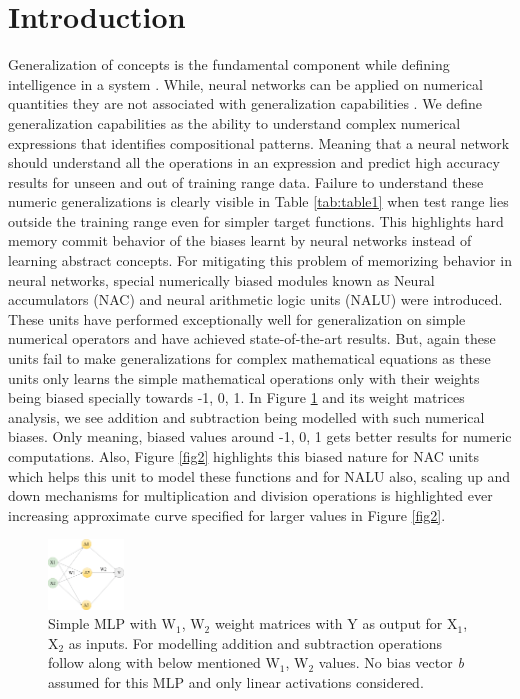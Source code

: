 \documentclass[conference]{IEEEtran}
\begin{document}
\section{Introduction}

Generalization of concepts is the fundamental component while defining intelligence in a system  \cite{b1} \cite{b2}. While, neural networks can be applied on numerical quantities they are not associated with generalization capabilities \cite{b3, b4}. We define generalization capabilities as the ability to understand complex numerical expressions that identifies compositional patterns. 
Meaning that a neural network should understand all the operations in an expression and predict high accuracy results for unseen and out of training range data.
Failure to understand these numeric generalizations is clearly visible in Table \ref{tab:table1} when test range lies outside the training range even for simpler target functions. This highlights hard memory commit behavior of the biases learnt by neural networks instead of learning abstract concepts. For mitigating this problem of memorizing behavior in neural networks, special numerically biased modules known as Neural accumulators (NAC) and neural arithmetic logic units (NALU) \cite{b5} were introduced. These units have performed exceptionally well for generalization on simple numerical operators and have achieved state-of-the-art results. But, again these units fail to make generalizations for complex mathematical equations as these units only learns the simple mathematical operations only with their weights being biased specially towards -1, 0, 1. In Figure \ref{fig1} and its weight matrices analysis, we see addition and subtraction being modelled with such numerical biases. Only meaning, biased values around -1, 0, 1 gets better results for numeric computations. Also, Figure \ref{fig2} highlights this biased nature for NAC units which helps this unit to model these functions and for NALU also, scaling up and down mechanisms for multiplication and division operations is highlighted ever increasing approximate curve specified for larger values in Figure \ref{fig2}.

\begin{figure}[!h]
\centering
\includegraphics[width=0.18\textwidth]{_assets/NeuralMLP.png}
\caption{Simple MLP with W$_1$, W$_2$ weight matrices with Y as output for X$_1$, X$_2$ as inputs. For modelling addition and subtraction operations follow along with below mentioned W$_1$, W$_2$ values. No bias vector \textit{b} assumed for this MLP and only linear activations considered.}
\label{fig1}
\end{figure}
\end{document}
